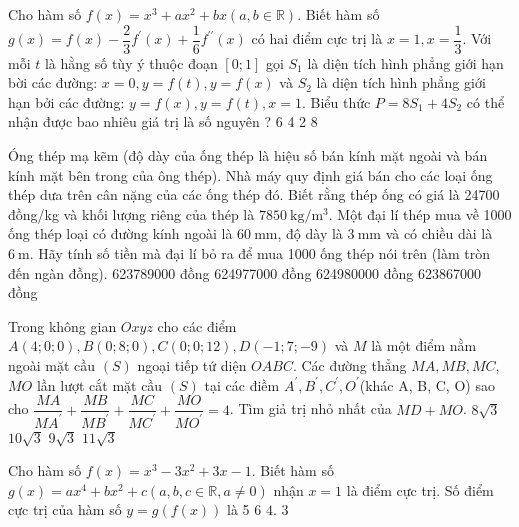 \begin{ex}
 Cho hàm số $f(x)=x^{3}+a x^{2}+b x(a, b \in \mathbb{R})$. Biết hàm số $g(x)=f(x)-\dfrac{2}{3} f^{\prime}(x)+\dfrac{1}{6} f^{\prime \prime}(x)$ có hai điểm cực trị là $x=1, x=\dfrac{1}{3}$. Với mỗi $t$ là hằng số tùy ý thuộc đoạn $[0; 1]$ gọi $S_{1}$ là diện tích hình phẳng giới hạn bời các đường: $x=0, y=f(t), y=f(x)$ và $S_{2}$ là diện tích hình phẳng giới hạn bởi các đường: $y=f(x), y=f(t), x=1$. Biểu thức $P=8 S_{1}+4 S_{2}$ có thể nhận được bao nhiêu giá trị là số nguyên ?
\choice
{6}
{4}
{2}
{8}
\end{ex}

\begin{ex}
 Óng thép mạ kẽm (độ dày của ống thép là hiệu số bán kính mặt ngoài và bán kính mặt bên trong của ông thép). Nhà máy quy định giá bán cho các loại ống thép dưa trên cân nặng của các ống thép đó. Biết rằng thép ống có giá là 24700 đồng/kg và khối lượng riêng của thép là $7850 \mathrm{~kg} / \mathrm{m}^{3}$. Một đại lí thép mua về 1000 ống thép loại có đường kính ngoài là $60 \mathrm{~mm}$, độ dày là $3 \mathrm{~mm}$ và có chiều dài là $6 \mathrm{~m}$. Hãy tính số tiền mà đại lí bỏ ra để mua 1000 ống thép nói trên (làm tròn đến ngàn đồng).
\choice
{623789000 đồng}
{624977000 đồng}
{624980000 đồng}
{623867000 đồng}
\end{ex}

\begin{ex}
 Trong không gian $O x y z$ cho các điểm $A(4; 0; 0), B(0; 8; 0), C(0; 0; 12), D(-1; 7;-9)$ và $M$ là một điểm nằm ngoài mặt cầu $(S)$ ngoại tiếp tứ diện $O A B C$. Các đường thẳng $M A, M B, M C$, $M O$ lần lượt cắt mặt cầu $(S)$ tại các điềm $A^{\prime}, B^{\prime}, C^{\prime}, O^{\prime}$(khác  A, B, C, O) sao cho $\dfrac{M A}{M A^{\prime}}+\dfrac{M B}{M B^{\prime}}+\dfrac{M C}{M C^{\prime}}+\dfrac{M O}{M O^{\prime}}=4$. Tìm giả trị nhỏ nhất của $M D+M O$.
\choice
{$8 \sqrt{3}$}
{$10 \sqrt{3}$}
{$9 \sqrt{3}$}
{$11 \sqrt{3}$}
\end{ex}

\begin{ex}
 Cho hàm số $f(x)=x^{3}-3 x^{2}+3 x-1$. Biết hàm số $g(x)=a x^{4}+b x^{2}+c(a, b, c \in \mathbb{R}, a \neq 0)$ nhận $x=1$ là điểm cực trị. Số điểm cực trị của hàm số $y=g(f(x))$ là
\choice
{5}
{6}
{$4.$}
{3}
\end{ex}
